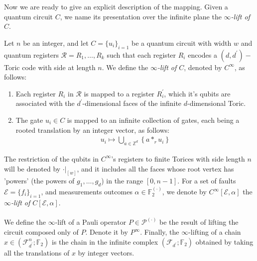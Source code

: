 Now we are ready to give an explicit description of the mapping. Given a quantum circuit $C$, we name its presentation over the infinite plane the \textit{$\infty$-lift of $C$}.
\begin{definition}
  \label{def:extension}
  Let $n$ be an integer, and let $C = \{u_{i}\}_{i=1}$ be a quantum circuit with width $w$ and quantum registers $\mathcal{R} = R_{1}, \ldots, R_{k}$ such that each register $R_{i}$ encodes a $(d,d^{\prime})- $Toric code with side at length $n$. We define the \textit{$\infty$-lift of $C$}, denoted by $C^{\infty}$, as follows:
  \begin{enumerate}
    \item Each register $R_{i}$ in $\mathcal{R}$ is mapped to a register $R^{\prime}_{i}$, which it's qubits are associated with the $d^{\prime}$-dimensional faces of the infinite $d$-dimensional Toric. 
    \item The gate $u_{i} \in C$ is mapped to an infinite collection of gates, each being a rooted translation by an integer vector, as follows:
      \begin{equation*}
        \begin{split}
          u_{i}  \mapsto  \bigcup_{ a \in \mathbb{Z}^{d} } \left\{ a *_{r} u_{i} \right\} 
        \end{split}
      \end{equation*}
  \end{enumerate}
  The restriction of the qubits in $C^{\infty}$'s registers to finite Torices with side length $n$ will be denoted by $\cdot |_{[w]}$, and it includes all the faces whose root vertex has 'powers' (the powers of $g_{1}, \ldots, g_{d}$) in the range $[0, n-1]$. For a set of faults $\mathcal{E} = \{ f_{i} \}_{i=1}$, and measurements outcomes $\alpha \in \mathbb{F}_2^{(\cdot)}$, we denote by $C^{\infty}[\mathcal{E},\alpha]$ the \textit{$\infty$-lift of $C[\mathcal{E},\alpha]$}. 
  \paragraph{ }
We define the $\infty$-lift of a Pauli operator $P \in \mathcal{P}^{(\cdot)}$ be the result of lifting the circuit composed only of $P$. Denote it by $P^{\infty}$. Finally, the $\infty$-lifting of a chain $x \in (\mathcal{F}^{n}_{d^{\prime}}; \mathbb{F}_{2})$ is the chain in the infinite complex $(\mathcal{F}_{d^{\prime}}; \mathbb{F}_{2})$ obtained by taking all the translations of $x$ by integer vectors.
\end{definition}



